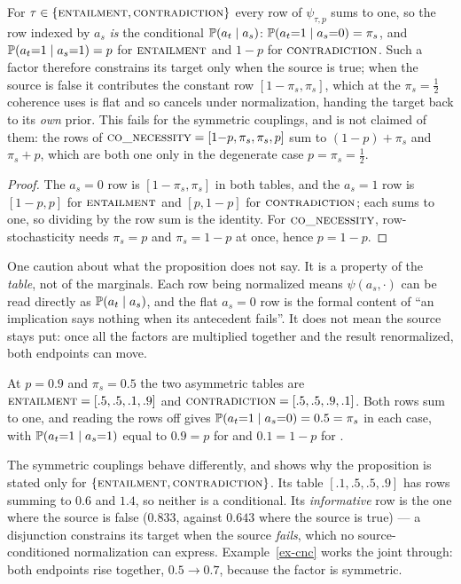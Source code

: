 \begin{proposition}
\label{prop-rowstoch}
For $\tau\in\{\textsc{entailment},\textsc{contradiction}\}$ every row of $\psi_{\tau,p}$ sums to one, so the row indexed by $a_s$ \emph{is} the
conditional $\mathbb{P}\!\left( a_t\mid a_s \right)$:
$\mathbb{P}\!\left( a_t{=}1 \mid a_s{=}0 \right) = \pi_s$, and $\mathbb{P}\!\left( a_t{=}1 \mid a_s{=}1 \right) = p$ for $\textsc{entailment}$ and $1-p$ for
$\textsc{contradiction}$. Such a factor therefore constrains its target only when the source is true; when the source
is false it contributes the constant row $[1-\pi_s,\pi_s]$, which at the $\pi_s=\tfrac12$ coherence uses is
flat and so cancels under normalization, handing the target back to its \emph{own} prior. This fails for the symmetric couplings, and is not
claimed of them: the rows of $\textsc{co\_necessity}=[1{-}p,\pi_s,\pi_s,p]$ sum to $(1-p)+\pi_s$ and $\pi_s+p$, which
are both one only in the degenerate case $p=\pi_s=\tfrac12$.
\end{proposition}

\begin{proof}
The $a_s{=}0$ row is $[1-\pi_s,\pi_s]$ in both tables, and the $a_s{=}1$ row is $[1-p,p]$ for $\textsc{entailment}$
and $[p,1-p]$ for $\textsc{contradiction}$; each sums to one, so dividing by the row sum is the identity. For $\textsc{co\_necessity}$,
row-stochasticity needs $\pi_s=p$ and $\pi_s=1-p$ at once, hence $p=1-p$.
\end{proof}

One caution about what the proposition does not say. It is a property of the \emph{table}, not of the
marginals. Each row being normalized means $\psi(a_s,\cdot)$ can be read directly as
$\mathbb{P}\!\left( a_t\mid a_s \right)$, and the flat $a_s{=}0$ row is the formal content of ``an implication says nothing when its
antecedent fails''. It does not mean the source stays put: once all the factors are multiplied together and the
result renormalized, both endpoints can move.

At $p=0.9$ and $\pi_s=0.5$ the two asymmetric tables are $\textsc{entailment}=[.5,.5,.1,.9]$ and $\textsc{contradiction}=[.5,.5,.9,.1]$. Both
rows sum to one, and reading the rows off gives $\mathbb{P}\!\left( a_t{=}1\mid a_s{=}0 \right)=0.5=\pi_s$ in each case, with
$\mathbb{P}\!\left( a_t{=}1\mid a_s{=}1 \right)$ equal to $0.9=p$ for \ent{} and $0.1=1-p$ for \con{}.

The symmetric couplings behave differently, and \cnc{} shows why the proposition is stated only for
$\{\textsc{entailment},\textsc{contradiction}\}$. Its table $[.1,.5,.5,.9]$ has rows summing to $0.6$ and $1.4$, so neither is a conditional. Its
\emph{informative} row is the one where the source is false ($0.833$, against $0.643$ where the source is
true) --- a disjunction constrains its target when the source \emph{fails}, which no source-conditioned
normalization can express. Example~\ref{ex-cnc} works the joint through: both endpoints rise together,
$0.5\to0.7$, because the factor is symmetric.

